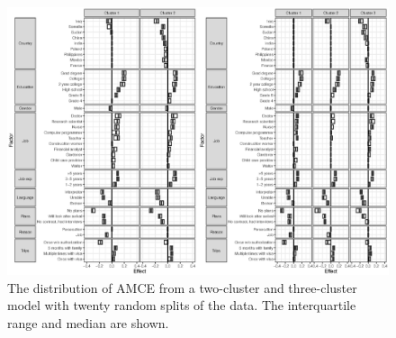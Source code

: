 \begin{figure}[!htbp]
	\centering {}
\includegraphics[width=\textwidth]{figures/app_repeat_hh_AME.eps}
\caption{The distribution of AMCE from a two-cluster and three-cluster model with twenty random splits of the data. The interquartile range and median are shown.} \label{fig:perm_AMCE}
\end{figure}

\documentclass[11pt]{article}


\addtolength{\hoffset}{-0.9in} \addtolength{\voffset}{-1in}
\addtolength{\textwidth}{1.8in} \addtolength{\textheight}{2in}


\newenvironment{set11}
{%
	\clearpage
	\let\orignewcommand\newcommand
	\let\newcommand\renewcommand
	\makeatletter
	\makeatother
	\let\newcommand\orignewcommand
}
{%
	\clearpage
}

\usepackage{latexsym,multirow}
\usepackage{amssymb,amsmath, bm}
\usepackage{graphicx}
\usepackage{booktabs}
\usepackage{caption}
\usepackage{subcaption}
\usepackage{enumerate}

\usepackage{natbib}
\usepackage{appendix}

